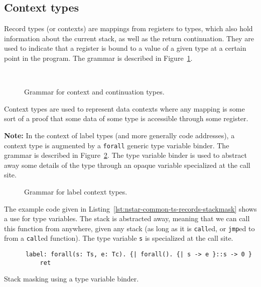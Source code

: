 \subsection{Context types}\label{subsec:nstar-common-ts-records}

Record types (or contexts) are mappings from registers to types, which also hold information about the current stack, as well as the return continuation.
They are used to indicate that a register is bound to a value of a given type at a certain point in the program.
The grammar is described in Figure~\ref{fig:nstar-common-ts-records-syntax}.

\begin{figure}[htb]
  \centering
  \\
  \caption{Grammar for context and continuation types.}
  \label{fig:nstar-common-ts-records-syntax}
\end{figure}

Context types are used to represent data contexts where any mapping is some sort of a proof that some data of some type is accessible through some register.

\vspace{\baselineskip}

\textbf{Note:} In the context of label types (and more generally code addresses), a context type is augmented by a \texttt{forall} generic type variable binder.
The grammar is described in Figure~\ref{fig:nstar-common-ts-label-types-syntax}.
The type variable binder is used to abstract away some details of the type through an opaque variable specialized at the call site.

\begin{figure}[htb]
  \centering
  \caption{Grammar for label context types.}
  \label{fig:nstar-common-ts-label-types-syntax}
\end{figure}

The example code given in Listing~\ref{lst:nstar-common-ts-records-stackmask} shows a use for type variables.
The stack is abstracted away, meaning that we can call this function from anywhere, given any stack (as long as it is \texttt{call}ed, or \texttt{jmp}ed to from a \texttt{call}ed function).
The type variable \texttt{s} is specialized at the call site.

\begin{listing}[htb]
  \centering
  \begin{minipage}{0.90\textwidth}
    \begin{verbatim}
      label: forall(s: Ts, e: Tc). {| forall(). {| s -> e }::s -> 0 }
          ret
    \end{verbatim}
  \end{minipage}
  \caption{Stack masking using a type variable binder.}
  \label{lst:nstar-common-ts-records-stackmask}
\end{listing}

